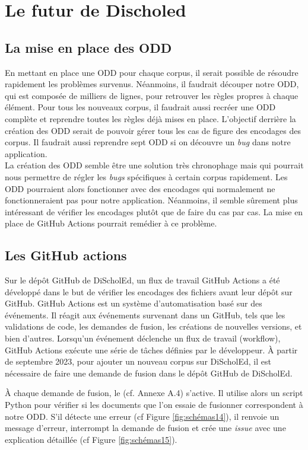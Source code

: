 \chapter{Le futur de Discholed}

\section{La mise en place des ODD}

En mettant en place une ODD pour chaque corpus, il serait possible de résoudre rapidement les problèmes survenus. Néanmoins, il faudrait découper notre ODD, qui est composée de milliers de lignes, pour retrouver les règles propres à chaque élément. Pour tous les nouveaux corpus, il faudrait aussi recréer une ODD complète et reprendre toutes les règles déjà mises en place. L'objectif derrière la création des ODD serait de pouvoir gérer tous les cas de figure des encodages des corpus. Il faudrait aussi reprendre sept ODD si on découvre un \textit{bug} dans notre application.\\

La création des ODD semble être une solution très chronophage mais qui pourrait nous permettre de régler les \textit{bugs} spécifiques à certain corpus rapidement. Les ODD pourraient alors fonctionner avec des encodages qui normalement ne fonctionneraient pas pour notre application. Néanmoins, il semble sûrement plus intéressant de vérifier les encodages plutôt que de faire du cas par cas. La mise en place de GitHub Actions pourrait remédier à ce problème.

\section{Les GitHub actions}

Sur le dépôt GitHub de DiScholEd, un flux de travail GitHub Actions a été développé dans le but de vérifier les encodages des fichiers avant leur dépôt sur GitHub. GitHub Actions est un système d'automatisation basé sur des événements. Il réagit aux événements survenant dans un GitHub, tels que les validations de code, les demandes de fusion, les créations de nouvelles versions, et bien d'autres. Lorsqu'un événement déclenche un flux de travail (workflow), GitHub Actions exécute une série de tâches définies par le développeur. À partir de septembre 2023, pour ajouter un nouveau corpus sur DiScholEd, il est nécessaire de faire une demande de fusion dans le dépôt GitHub de DiScholEd.

À chaque demande de fusion, le (cf. Annexe A.4) s'active. Il utilise alors un script Python pour vérifier si les documents que l'on essaie de fusionner correspondent à notre ODD. S'il détecte une erreur (cf Figure \ref{fig:schémas14}), il renvoie un message d'erreur, interrompt la demande de fusion et crée une \textit{issue} avec une explication détaillée (cf Figure \ref{fig:schémas15}).

